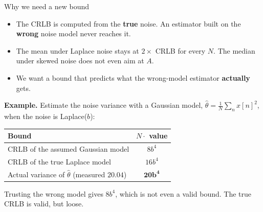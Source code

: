 \documentclass[aspectratio=169, 11pt]{beamer}
\begin{document}
\begin{frame}{Why we need a new bound}
  \begin{itemize}
    \item The CRLB is computed from the \textbf{true} noise. An estimator built on the \textbf{wrong} noise model never reaches it.
    \item The mean under Laplace noise stays at $2\times$ CRLB for every $N$. The median under skewed noise does not even aim at $A$.
    \item We want a bound that predicts what the wrong-model estimator \textbf{actually} gets.
  \end{itemize}
  \vspace{0.5em}
  \textbf{Example.} Estimate the noise variance with a Gaussian model, $\hat\theta = \frac1N\sum_n x[n]^2$, when the noise is Laplace($b$):
  \vspace{0.3em}
  \begin{center}
    \begin{tabular}{lc}
      \toprule
      Bound & $N \cdot$ value \\
      \midrule
      CRLB of the assumed Gaussian model & $8b^4$ \\
      CRLB of the true Laplace model & $16b^4$ \\
      Actual variance of $\hat\theta$ (measured $20.04$) & $\mathbf{20b^4}$ \\
      \bottomrule
    \end{tabular}
  \end{center}
  \vspace{0.3em}
  Trusting the wrong model gives $8b^4$, which is not even a valid bound. The true CRLB is valid, but loose.
\end{frame}
\end{document}
